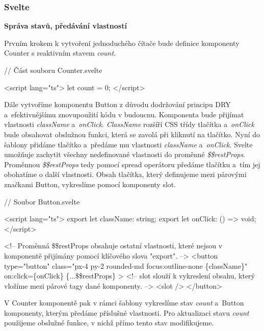\subsubsection{Svelte}

\begin{flushleft}
  \textbf{Správa stavů, předávání vlastností}
\end{flushleft}

Prvním krokem k vytvoření jednoduchého čítače bude definice komponenty Counter s reaktivním stavem \emph{count}.

\begin{prog}
// Část souboru Counter.svelte

<script lang="ts">
  let count = 0;
</script>
\end{prog}

Dále vytvoříme komponentu Button z důvodu dodržování principu DRY a~efektivnějšímu znovupoužití kódu v budoucnu.
Komponenta bude přijímat vlastnosti \emph{className} a~\emph{onClick}. \emph{ClassName} rozšíří CSS třídy tlačítka a~\emph{onClick} bude obsahovat obslužnou funkci, která se zavolá při kliknutí na tlačítko.
Nyní do šablony přidáme tlačítko a~předáme mu vlastnosti \emph{className} a~\emph{onClick}.
Svelte umožňuje zachytit všechny nedefinované vlastnosti do proměnné \emph{\$\$restProps}. Proměnnou \emph{\$\$restProps} tedy pomocí spread operátoru předáme tlačítku a~tím jej obohatíme o další vlastnosti. 
Obsah tlačítka, který definujeme mezi párovými značkami Button, vykreslíme pomocí komponenty slot.

\begin{prog}
// Soubor Button.svelte

<script lang="ts">
  export let className: string;
  export let onClick: () => void;
</script>

<!-- Proměnná \$\$restProps obsahuje ostatní vlastnosti, 
  které nejsou v komponentě přijímány pomocí klíčového slova "export". -->
<button
  type="button"
  class="px-4 py-2 rounded-md focus:outline-none \{className\}"
  on:click=\{onClick\}
  \{...\$\$restProps\}
>
  <!-- slot slouží k vykreslení obsahu, 
    který vložíme mezi párové tagy dané komponenty. -->
  <slot />
</button>
\end{prog}

V Counter komponentě pak v rámci šablony vykreslíme stav \emph{count} a~Button komponenty, kterým předáme příslušné vlastnosti. 
Pro aktualizaci stavu \emph{count} použijeme obslužné funkce, v nichž přímo tento stav modifikujeme.

